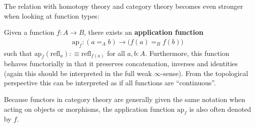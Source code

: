     The relation with homotopy theory and category theory becomes even stronger when looking at function types:
    \begin{property}
        Given a function $f:A\rightarrow B$, there exists an \textbf{application function}
        \begin{gather}
            \mathrm{ap}_f:(a=_Ab)\rightarrow\big(f(a)=_Bf(b)\big)
        \end{gather}
        such that $\mathrm{ap}_f(\mathrm{refl}_a):\equiv\mathrm{refl}_{f(a)}$ for all $a,b:A$. Furthermore, this function behaves functorially in that it preserves concatenation, inverses and identities (again this should be interpreted in the full weak $\infty$-sense). From the topological perspective this can be interpreted as if all functions are ``continuous''.
    \end{property}
    \begin{notation}
        Because functors in category theory are generally given the same notation when acting on objects or morphisms, the application function $\mathrm{ap}_f$ is also often denoted by $f$.
    \end{notation}

